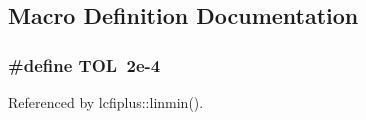\subsection{Macro Definition Documentation}
\subsubsection[{T\-O\-L}]{\setlength{\rightskip}{0pt plus 5cm}\#define T\-O\-L~2e-\/4}\label{algo_8cc_a156b862ebf6d213f5da19b9e3ccb779e}


Referenced by lcfiplus\-::linmin().

